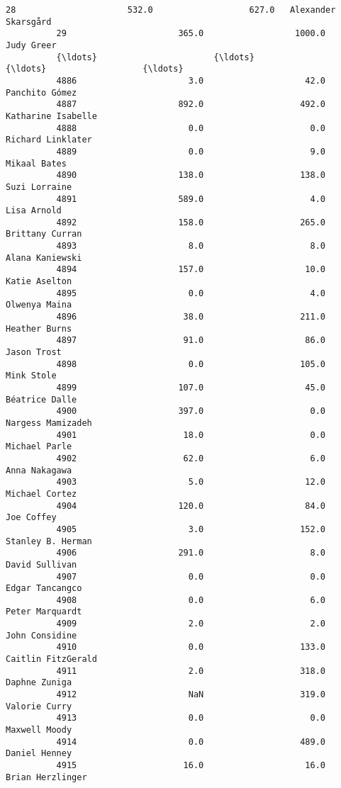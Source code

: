 \documentclass[11pt]{article}
\begin{document}
\begin{Verbatim}[commandchars=\\\{\}]
          28                      532.0                   627.0   Alexander Skarsgård   
          29                      365.0                  1000.0            Judy Greer   
          {\ldots}                       {\ldots}                     {\ldots}                   {\ldots}   
          4886                      3.0                    42.0        Panchito Gómez   
          4887                    892.0                   492.0    Katharine Isabelle   
          4888                      0.0                     0.0     Richard Linklater   
          4889                      0.0                     9.0          Mikaal Bates   
          4890                    138.0                   138.0         Suzi Lorraine   
          4891                    589.0                     4.0           Lisa Arnold   
          4892                    158.0                   265.0       Brittany Curran   
          4893                      8.0                     8.0       Alana Kaniewski   
          4894                    157.0                    10.0         Katie Aselton   
          4895                      0.0                     4.0         Olwenya Maina   
          4896                     38.0                   211.0         Heather Burns   
          4897                     91.0                    86.0           Jason Trost   
          4898                      0.0                   105.0            Mink Stole   
          4899                    107.0                    45.0        Béatrice Dalle   
          4900                    397.0                     0.0     Nargess Mamizadeh   
          4901                     18.0                     0.0         Michael Parle   
          4902                     62.0                     6.0         Anna Nakagawa   
          4903                      5.0                    12.0        Michael Cortez   
          4904                    120.0                    84.0            Joe Coffey   
          4905                      3.0                   152.0     Stanley B. Herman   
          4906                    291.0                     8.0        David Sullivan   
          4907                      0.0                     0.0       Edgar Tancangco   
          4908                      0.0                     6.0       Peter Marquardt   
          4909                      2.0                     2.0        John Considine   
          4910                      0.0                   133.0    Caitlin FitzGerald   
          4911                      2.0                   318.0         Daphne Zuniga   
          4912                      NaN                   319.0         Valorie Curry   
          4913                      0.0                     0.0         Maxwell Moody   
          4914                      0.0                   489.0         Daniel Henney   
          4915                     16.0                    16.0      Brian Herzlinger   
          

\end{Verbatim}
\end{document}
